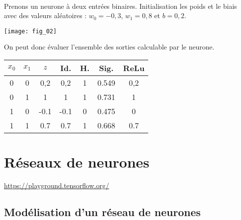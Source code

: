 \begin{exemple}~\\



\begin{minipage}[c]{.4\linewidth}

Prenons un neurone à deux entrées binaires. 
Initialisation les poids et le biais avec des valeurs aléatoires : $w_0 = -0,3$, $w_1 = 0,8$ et $b=0,2$.

\begin{center}
\texttt{[image: fig\_02]}
\end{center}
\hfill
\end{minipage}
\begin{minipage}[c]{.55\linewidth}


On peut donc évaluer l'ensemble des sorties calculable par le neurone.

\begin{center}
\begin{tabular}{|c|c|| c || c| c|c|c|}
\hline
$x_0$ & $x_1$ & $z$ & Id. & H. & Sig. & ReLu \\
\hline
\hline
0 & 0 & 0,2   &   0,2   &  1 & 0.549 & 0,2 \\
0 & 1 & 1     &    1     &  1 & 0.731  & 1\\
1 & 0 & -0.1  &    -0.1 &  0 &0.475 & 0 \\
1 & 1 & 0.7  &     0.7  &  1 &0.668 & 0.7\\
\hline
\end{tabular}
\end{center}
\end{minipage}

\end{exemple}


\section{Réseaux de neurones}
\url{https://playground.tensorflow.org/}


\subsection{Modélisation d'un réseau de neurones} 

